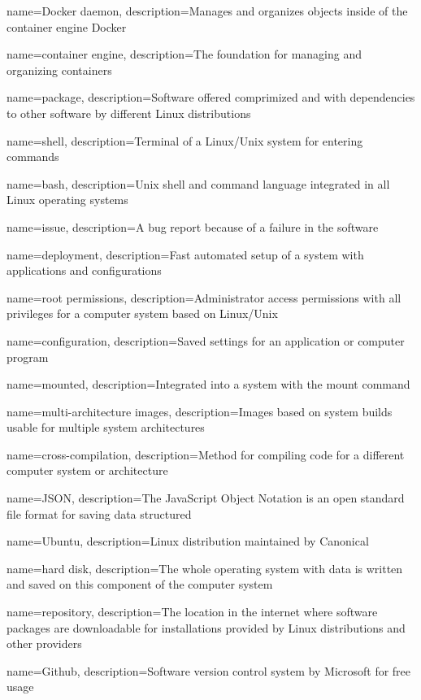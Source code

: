 {
    name={Docker daemon},
    description={Manages and organizes objects inside of the container engine Docker}
}

{
    name={container engine},
    description={The foundation for managing and organizing containers}
}

{
    name={package},
    description={Software offered comprimized and with dependencies to other software by different Linux distributions}
}

{
    name={shell},
    description={Terminal of a Linux/Unix system for entering commands}
}

{
    name={bash},
    description={Unix shell and command language integrated in all Linux operating systems}
}

{
    name={issue},
    description={A bug report because of a failure in the software}
}

{
    name={deployment},
    description={Fast automated setup of a system with applications and configurations}
}

{
    name={root permissions},
    description={Administrator access permissions with all privileges for a computer system based on Linux/Unix}
}

{
    name={configuration},
    description={Saved settings for an application or computer program}
}

{
    name={mounted},
    description={Integrated into a system with the mount command}
}

{
    name={multi-architecture images},
    description={Images based on system builds usable for multiple system architectures}
}

{
    name={cross-compilation},
    description={Method for compiling code for a different computer system or architecture}
}

{
    name={JSON},
    description={The JavaScript Object Notation is an open standard file format for saving data structured}
}

{
    name={Ubuntu},
    description={Linux distribution maintained by Canonical}
}

{
    name={hard disk},
    description={The whole operating system with data is written and saved on this component of the computer system}
}

{
    name={repository},
    description={The location in the internet where software packages are downloadable for installations provided by Linux distributions and other providers}
}

{
    name={Github},
    description={Software version control system by Microsoft for free usage}
}

\glsaddall
